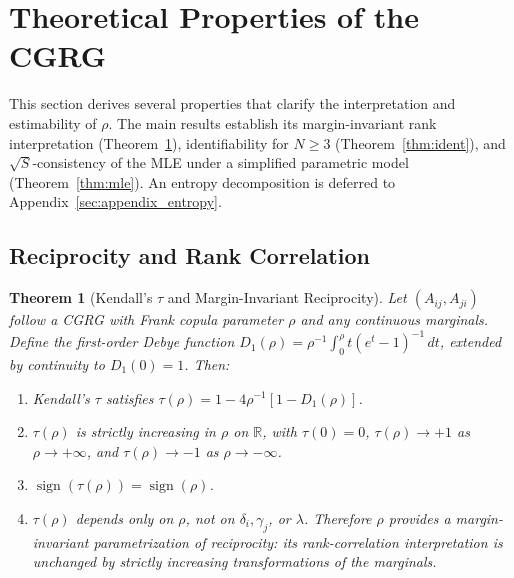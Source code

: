 \documentclass[12pt]{article}
\newtheorem{theorem}{Theorem}[section]
\begin{document}
\section{Theoretical Properties of the CGRG}
\label{sec:theory}

This section derives several properties that clarify the interpretation and
estimability of $\rho$.  The main results establish its margin-invariant rank
interpretation (Theorem~\ref{thm:tau}), identifiability for $N \geq 3$
(Theorem~\ref{thm:ident}), and $\sqrt{S}$-consistency of the MLE under a
simplified parametric model (Theorem~\ref{thm:mle}).  An entropy decomposition
is deferred to Appendix~\ref{sec:appendix_entropy}.

\subsection{Reciprocity and Rank Correlation}

\begin{theorem}[Kendall's $\tau$ and Margin-Invariant Reciprocity]
\label{thm:tau}
Let $(A_{ij}, A_{ji})$ follow a CGRG with Frank copula parameter $\rho$ and
any continuous marginals.  Define the first-order Debye function
$D_1(\rho) = \rho^{-1}\int_0^\rho t(e^t - 1)^{-1}\,dt$, extended by
continuity to $D_1(0) = 1$.  Then:
\begin{enumerate}
\item[\rm (a)] Kendall's $\tau$ satisfies
  $\tau(\rho) = 1 - 4\rho^{-1}[1 - D_1(\rho)]$.
\item[\rm (b)] $\tau(\rho)$ is strictly increasing in $\rho$ on
  $\mathbb{R}$, with $\tau(0) = 0$, $\tau(\rho) \to +1$ as
  $\rho \to +\infty$, and $\tau(\rho) \to -1$ as $\rho \to -\infty$.
\item[\rm (c)] $\operatorname{sign}(\tau(\rho)) = \operatorname{sign}(\rho)$.
\item[\rm (d)] $\tau(\rho)$ depends only on $\rho$, not on
  $\delta_i, \gamma_j$, or $\lambda$.  Therefore $\rho$ provides a
  \emph{margin-invariant} parametrization of reciprocity: its rank-correlation
  interpretation is unchanged by strictly increasing transformations of the
  marginals.
\end{enumerate}
\end{theorem}
\end{document}
